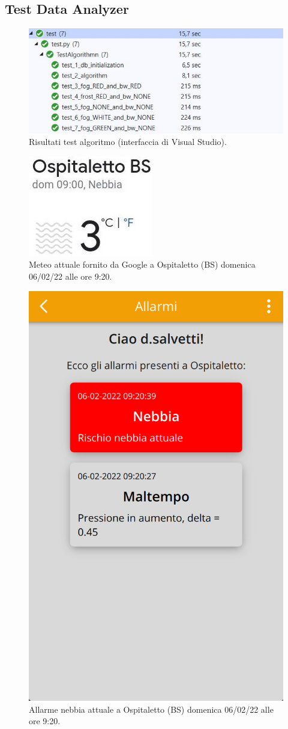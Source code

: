 \subsection{Test Data Analyzer}

\begin{figure}[h!]
	\centering
	\includegraphics[width=1\linewidth]{./Iterazione 3/ImageFiles/TestResultAlgorithm}
	\caption{Risultati test algoritmo (interfaccia di Visual Studio).}
	\label{fig:test_result_alg}
\end{figure}

\UseRawInputEncoding


\begin{figure}[h!]
	\centering
	\includegraphics[width=0.2\linewidth]{./Iterazione 3/ImageFiles/Nebbia Ospitaletto Google}
	\caption{Meteo attuale fornito da Google a Ospitaletto (BS) domenica 06/02/22 alle ore 9:20.}
	\label{fig:test_previsione}
\end{figure}

\begin{figure}[h!]
	\centering
	\includegraphics[width=0.3\linewidth]{./Iterazione 3/ImageFiles/testAppRedFog}
	\caption{Allarme nebbia attuale a Ospitaletto (BS) domenica 06/02/22 alle ore 9:20.}
	\label{fig:test_previsione}
\end{figure}